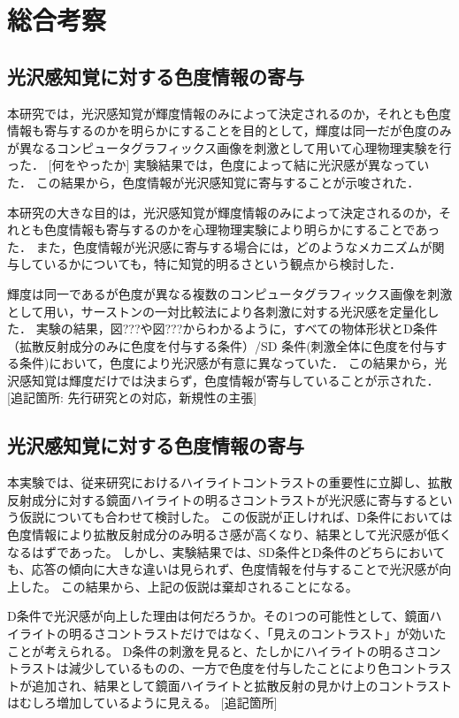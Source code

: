 \chapter{総合考察}
    \section{光沢感知覚に対する色度情報の寄与}
        本研究では，光沢感知覚が輝度情報のみによって決定されるのか，それとも色度情報も寄与するのかを明らかにすることを目的として，輝度は同一だが色度のみが異なるコンピュータグラフィックス画像を刺激として用いて心理物理実験を行った．
        [何をやったか]
        実験結果では，色度によって結に光沢感が異なっていた．
        この結果から，色度情報が光沢感知覚に寄与することが示唆された．

        本研究の大きな目的は，光沢感知覚が輝度情報のみによって決定されるのか，それとも色度情報も寄与するのかを心理物理実験により明らかにすることであった．
        また，色度情報が光沢感に寄与する場合には，どのようなメカニズムが関与しているかについても，特に知覚的明るさという観点から検討した．

        輝度は同一であるが色度が異なる複数のコンピュータグラフィックス画像を刺激として用い，サーストンの一対比較法により各刺激に対する光沢感を定量化した．
        実験の結果，図???や図???からわかるように，すべての物体形状とD条件（拡散反射成分のみに色度を付与する条件）/SD 条件(刺激全体に色度を付与する条件)において，色度により光沢感が有意に異なっていた．
        この結果から，光沢感知覚は輝度だけでは決まらず，色度情報が寄与していることが示された．
        [追記箇所: 先行研究との対応，新規性の主張]

    \section{光沢感知覚に対する色度情報の寄与}
        本実験では、従来研究におけるハイライトコントラストの重要性に立脚し、拡散反射成分に対する鏡面ハイライトの明るさコントラストが光沢感に寄与するという仮説についても合わせて検討した。
        この仮説が正しければ、D条件においては色度情報により拡散反射成分のみ明るさ感が高くなり、結果として光沢感が低くなるはずであった。
        しかし、実験結果では、SD条件とD条件のどちらにおいても、応答の傾向に大きな違いは見られず、色度情報を付与することで光沢感が向上した。
        この結果から、上記の仮説は棄却されることになる。

        D条件で光沢感が向上した理由は何だろうか。その1つの可能性として、鏡面ハイライトの明るさコントラストだけではなく、「見えのコントラスト」が効いたことが考えられる。
        D条件の刺激を見ると、たしかにハイライトの明るさコントラストは減少しているものの、一方で色度を付与したことにより色コントラストが追加され、結果として鏡面ハイライトと拡散反射の見かけ上のコントラストはむしろ増加しているように見える。
        [追記箇所]


